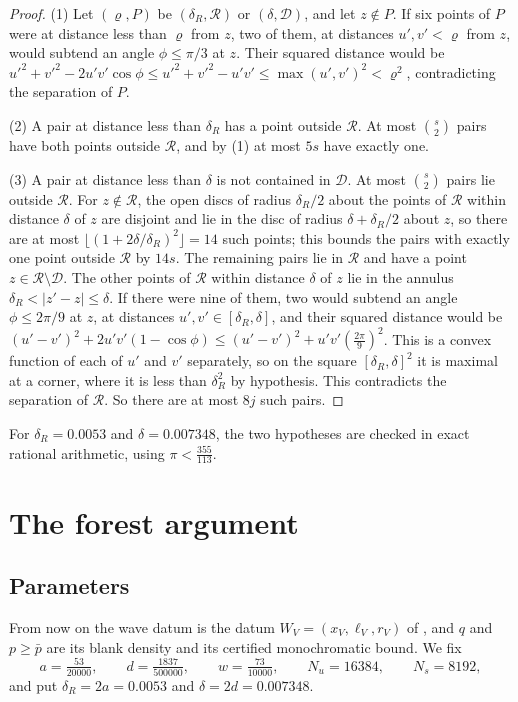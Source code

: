 \documentclass[11pt,colorlinks]{charlie}
\newcommand{\cR}{\mathcal{R}}
\newcommand{\cD}{\mathcal{D}}
\begin{document}
\begin{proof}
(1) Let $(\varrho,P)$ be $(\delta_R,\cR)$ or $(\delta,\cD)$, and let $z\notin P$. If six points of $P$ were at distance less than $\varrho$ from $z$, two of them, at distances $u',v'<\varrho$ from $z$, would subtend an angle $\phi\le\pi/3$ at $z$. Their squared distance would be $u'^2+v'^2-2u'v'\cos\phi\le u'^2+v'^2-u'v'\le\max(u',v')^2<\varrho^2$, contradicting the separation of $P$.

(2) A pair at distance less than $\delta_R$ has a point outside $\cR$. At most $\binom s2$ pairs have both points outside $\cR$, and by (1) at most $5s$ have exactly one.

(3) A pair at distance less than $\delta$ is not contained in $\cD$. At most $\binom s2$ pairs lie outside $\cR$. For $z\notin\cR$, the open discs of radius $\delta_R/2$ about the points of $\cR$ within distance $\delta$ of $z$ are disjoint and lie in the disc of radius $\delta+\delta_R/2$ about $z$, so there are at most $\lfloor(1+2\delta/\delta_R)^2\rfloor=14$ such points; this bounds the pairs with exactly one point outside $\cR$ by $14s$. The remaining pairs lie in $\cR$ and have a point $z\in\cR\setminus\cD$. The other points of $\cR$ within distance $\delta$ of $z$ lie in the annulus $\delta_R<|z'-z|\le\delta$. If there were nine of them, two would subtend an angle $\phi\le2\pi/9$ at $z$, at distances $u',v'\in[\delta_R,\delta]$, and their squared distance would be $(u'-v')^2+2u'v'(1-\cos\phi)\le(u'-v')^2+u'v'(\tfrac{2\pi}9)^2$. This is a convex function of each of $u'$ and $v'$ separately, so on the square $[\delta_R,\delta]^2$ it is maximal at a corner, where it is less than $\delta_R^2$ by hypothesis. This contradicts the separation of $\cR$. So there are at most $8j$ such pairs.
\end{proof}

For $\delta_R=0.0053$ and $\delta=0.007348$, the two hypotheses are checked in exact rational arithmetic, using $\pi<\frac{355}{113}$.

\section{The forest argument}\label{sec:forest}

\subsection{Parameters}
From now on the wave datum is the datum $W_V=(x_V,\ell_V,r_V)$ of , and $q$ and $p\ge\bar p$ are its blank density and its certified monochromatic bound. We fix
\[
 a=\tfrac{53}{20000},\qquad d=\tfrac{1837}{500000},\qquad w=\tfrac{73}{10000},\qquad N_u=16384,\qquad N_s=8192,
\]
and put $\delta_R=2a=0.0053$ and $\delta=2d=0.007348$.
\end{document}
